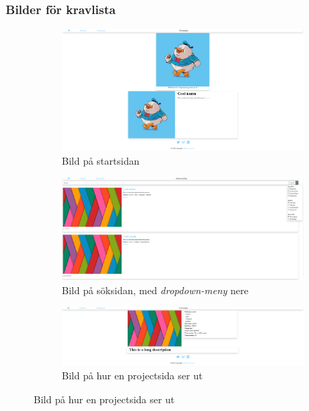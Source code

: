 \documentclass{TDP003mall}
\begin{document}
\subsubsection{Bilder för kravlista}
\begin{figure}[H]
    \centering
    \begin{subfigure}[b]{0.49\textwidth}
        \includegraphics[width=\textwidth, frame]{indexpage.png}
        \caption{Bild på startsidan}
        \label{fig:indexpage}
    \end{subfigure}%
    \hfill
    \begin{subfigure}[b]{0.49\textwidth}
        \includegraphics[width=\textwidth, frame]{listpage.png}
        \caption{Bild på söksidan, med \textit{dropdown-meny} nere}
        \label{fig:listpage}
    \end{subfigure}
    \hfill
    \begin{subfigure}[b]{0.49\textwidth}
        \includegraphics[width=\textwidth, frame]{projectpage.png}
        \caption{Bild på hur en projectsida ser ut}

\end{subfigure}
\end{figure}
\end{document}
